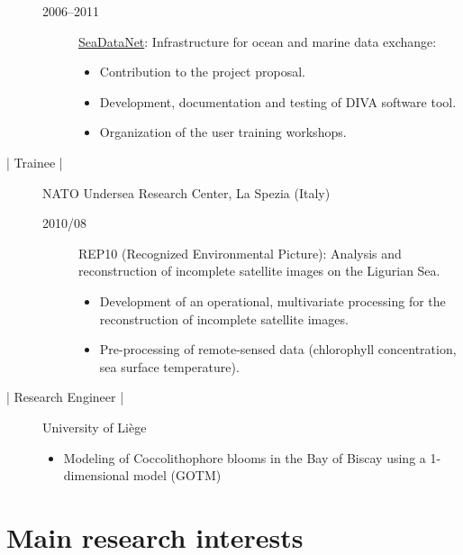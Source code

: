 \documentclass[10pt,a4paper,svgnames]{article}
\begin{document}
\begin{description}
\begin{description}
\item[2006--2011] \href{https://www.seadatanet.org}{SeaDataNet}: Infrastructure for ocean and marine data exchange:
\begin{itemize}
\item Contribution to the project proposal.
\item Development, documentation and testing of DIVA software tool.
\item Organization of the user training workshops.
\end{itemize}

\end{description}



\item[\datebox{2010/08--2010/09} | Trainee |] NATO Undersea Research Center, La Spezia (Italy)

\begin{description}
\item[2010/08] REP10 (Recognized Environmental Picture): Analysis and reconstruction of incomplete satellite images on the Ligurian Sea.
\begin{itemize}%
\item Development of an operational, multivariate processing for the reconstruction of incomplete satellite images.
\item Pre-processing of remote-sensed data (chlorophyll concentration, sea surface temperature).
\end{itemize}
\end{description}


\item[\datebox{2005/10--2005/12} | Research Engineer |] University of Li\`{e}ge

\begin{itemize}
\item Modeling of Coccolithophore blooms in the Bay of Biscay using a 1-dimensional model (GOTM)
\end{itemize}
\end{description}



\section{Main research interests}
\end{document}
